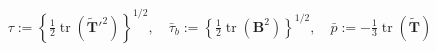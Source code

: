 \documentclass[preview]{standalone}
\begin{document}
\begin{align*}
\tau := \left\{ \tfrac{1}{2} \operatorname{tr}(\tilde{\mathbf{T}}'^2) \right\}^{1/2}, \quad\bar{\tau}_b := \left\{ \tfrac{1}{2} \operatorname{tr}(\mathbf{B}^2) \right\}^{1/2}, \quad\bar{p} := -\tfrac{1}{3} \operatorname{tr}(\tilde{\mathbf{T}})
\end{align*}
\end{document}
